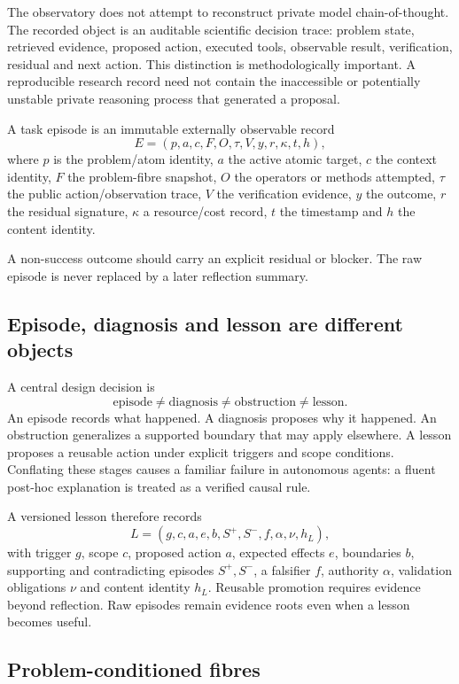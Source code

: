 The observatory does not attempt to reconstruct private model chain-of-thought. The recorded object is an auditable scientific decision trace: problem state, retrieved evidence, proposed action, executed tools, observable result, verification, residual and next action. This distinction is methodologically important. A reproducible research record need not contain the inaccessible or potentially unstable private reasoning process that generated a proposal.

\begin{definition}
A task episode is an immutable externally observable record
\[
E=(p,a,c,F,O,\tau,V,y,r,\kappa,t,h),
\]
where $p$ is the problem/atom identity, $a$ the active atomic target, $c$ the context identity, $F$ the problem-fibre snapshot, $O$ the operators or methods attempted, $\tau$ the public action/observation trace, $V$ the verification evidence, $y$ the outcome, $r$ the residual signature, $\kappa$ a resource/cost record, $t$ the timestamp and $h$ the content identity.
\end{definition}

A non-success outcome should carry an explicit residual or blocker. The raw episode is never replaced by a later reflection summary.

\subsection{Episode, diagnosis and lesson are different objects}

A central design decision is
\[
\boxed{\text{episode} \neq \text{diagnosis} \neq \text{obstruction} \neq \text{lesson}}.
\]
An episode records what happened. A diagnosis proposes why it happened. An obstruction generalizes a supported boundary that may apply elsewhere. A lesson proposes a reusable action under explicit triggers and scope conditions. Conflating these stages causes a familiar failure in autonomous agents: a fluent post-hoc explanation is treated as a verified causal rule.

A versioned lesson therefore records
\[
L=(g,c,a,e,b,S^+,S^-,f,\alpha,\nu,h_L),
\]
with trigger $g$, scope $c$, proposed action $a$, expected effects $e$, boundaries $b$, supporting and contradicting episodes $S^+,S^-$, a falsifier $f$, authority $\alpha$, validation obligations $\nu$ and content identity $h_L$. Reusable promotion requires evidence beyond reflection. Raw episodes remain evidence roots even when a lesson becomes useful.

\subsection{Problem-conditioned fibres}

